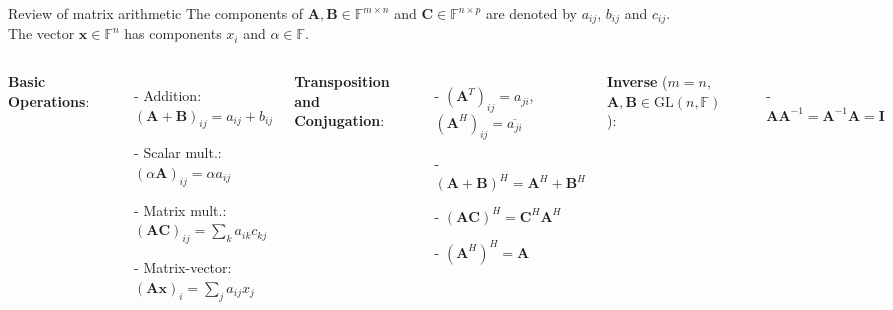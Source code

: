 \documentclass[t,usepdftitle=false]{beamer}
\begin{document}
\begin{frame}{Review of matrix arithmetic}
\footnotesize
The components of $\mathbf{A},\mathbf{B}\in\mathbb{F}^{m\times n}$ and $\mathbf{C}\in\mathbb{F}^{n\times p}$ are denoted by $a_{ij}$, $b_{ij}$ and $c_{ij}$.\vspace{.1cm}\\
The vector $\mathbf{x}\in\mathbb{F}^n$ has components $x_i$ and $\alpha\in\mathbb{F}$.\vspace{.1cm}\\
\hspace{0.3cm}  %
\begin{minipage}{\dimexpr\textwidth-1cm}
\begin{columns}
\textbf{Basic Operations}:\vspace{-.05cm}
\begin{itemize}
\item[-] Addition: $(\mathbf{A} + \mathbf{B})_{ij} = a_{ij} + b_{ij}$\vspace{-.05cm}
\item[-] Scalar mult.: $(\alpha\mathbf{A})_{ij} = \alpha a_{ij}$\vspace{-.05cm}
\item[-] Matrix mult.: $(\mathbf{A}\mathbf{C})_{ij} = \sum_k a_{ik}c_{kj}$\vspace{-.05cm}
\item[-] Matrix-vector: $(\mathbf{A}\mathbf{x})_i = \sum_j a_{ij}x_j$
\end{itemize}
\textbf{Transposition and Conjugation}:\vspace{-.05cm}
\begin{itemize}
\item[-] $(\mathbf{A}^T)_{ij} = a_{ji}$, $(\mathbf{A}^H)_{ij} = \overline{a_{ji}}$\vspace{-.05cm}
\item[-] $(\mathbf{A} + \mathbf{B})^H = \mathbf{A}^H + \mathbf{B}^H$\vspace{-.05cm}
\item[-] $(\mathbf{A}\mathbf{C})^H = \mathbf{C}^H \mathbf{A}^H$\vspace{-.05cm}
\item[-] $(\mathbf{A}^H)^H = \mathbf{A}$
\end{itemize}
\textbf{Inverse} ($m=n$, $\mathbf{A},\mathbf{B}\in\mathrm{GL}(n,\mathbb{F})$):\vspace{-.05cm}
\begin{itemize}
\item[-] $\mathbf{A}\mathbf{A}^{-1} = \mathbf{A}^{-1}\mathbf{A} = \mathbf{I}$\vspace{-.05cm}

\end{itemize}
\end{columns}
\end{minipage}
\end{frame}
\end{document}
